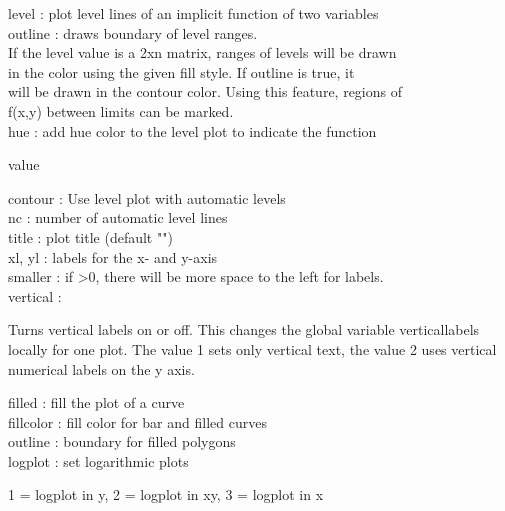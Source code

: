\documentclass[a4paper,10pt]{article}
\begin{document}
\begin{eulernotebook}
\begin{eulercomment}
\begin{eulercomment}
\begin{eulercomment}
\begin{eulercomment}
\begin{eulercomment}
\begin{eulercomment}
\begin{eulercomment}
level     : plot level lines of an implicit function of two variables\\
outline   : draws boundary of level ranges.
\\
If the level value is a 2xn matrix, ranges of levels will be drawn\\
in the color using the given fill style. If outline is true, it\\
will be drawn in the contour color. Using this feature, regions of\\
f(x,y) between limits can be marked.
\\
hue       : add hue color to the level plot to indicate the function\\
\end{eulercomment}
\begin{eulerttcomment}
            value
\end{eulerttcomment}
\begin{eulercomment}
contour   : Use level plot with automatic levels\\
nc        : number of automatic level lines\\
title     : plot title (default "")\\
xl, yl    : labels for the x- and y-axis\\
smaller   : if \textgreater{}0, there will be more space to the left for labels.\\
vertical  :\\
\end{eulercomment}
\begin{eulerttcomment}
  Turns vertical labels on or off. This changes the global variable
  verticallabels locally for one plot. The value 1 sets only vertical
  text, the value 2 uses vertical numerical labels on the y axis.
\end{eulerttcomment}
\begin{eulercomment}
filled    : fill the plot of a curve\\
fillcolor : fill color for bar and filled curves\\
outline   : boundary for filled polygons\\
logplot   : set logarithmic plots\\
\end{eulercomment}
\begin{eulerttcomment}
            1 = logplot in y,
            2 = logplot in xy,
            3 = logplot in x
\end{eulerttcomment}
\begin{eulercomment}

\end{eulercomment}
\end{eulercomment}
\end{eulercomment}
\end{eulercomment}
\end{eulercomment}
\end{eulercomment}
\end{eulercomment}
\end{eulernotebook}
\end{document}
